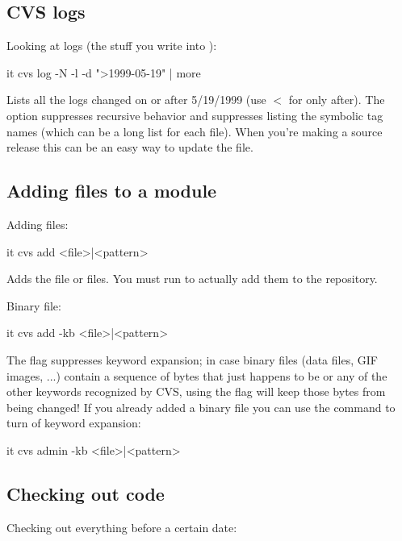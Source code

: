 \documentclass{dods-paper}
\begin{document}
\subsection{CVS logs}

Looking at logs (the stuff you write into ):

\begin{vcode}{it}
cvs log -N -l -d ">1999-05-19" | more
\end{vcode}

Lists all the logs changed on or after 5/19/1999 (use $<$ for only after).
The  option suppresses recursive behavior and  suppresses
listing the symbolic tag names (which can be a long list for each file). When
you're making a source release this can be an easy way to update the
 file.

\subsection{Adding files to a module}

Adding files:

\begin{vcode}{it}
cvs add <file>|<pattern>
\end{vcode}

Adds the file or files. You must run  to actually add them to
the repository.

Binary file:

\begin{vcode}{it}
cvs add -kb <file>|<pattern>
\end{vcode}

The  flag suppresses keyword expansion; in case binary files (data
files, GIF images, ...) contain a sequence of bytes that just happens to be
 or any of the other keywords recognized by CVS, using the
 flag will keep those bytes from being changed! If you already added
a binary file you can use the  command to turn of keyword
expansion:

\begin{vcode}{it}
cvs admin -kb <file>|<pattern>
\end{vcode}

\subsection{Checking out code}

Checking out everything before a certain date:
\end{document}
